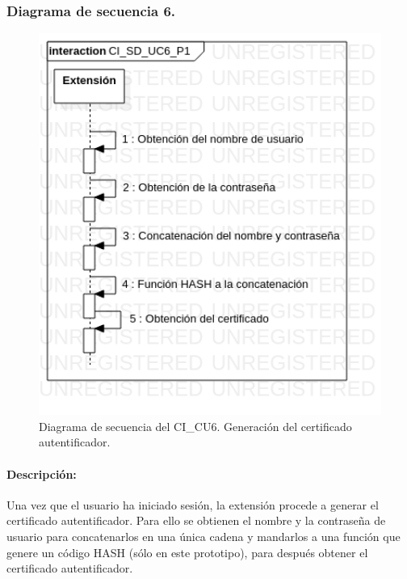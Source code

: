 \documentclass[12pt, a4paper, titlepage]{report}
\begin{document}
    			\subsubsection{Diagrama de secuencia 6.}
        			\begin{figure}[H]
        				\begin{center}    		    	\includegraphics[width=15cm]{./imagenes/Disenio/Componente_1/CI_SD_UC6_P1.png}
        				\caption[Diagrama de secuencia 6 del Componente I]{Diagrama de secuencia del CI\_CU6. Generación del certificado autentificador.}
        				\end{center}
        			\end{figure}
        			
        			\paragraph{Descripción:}
        			Una vez que el usuario ha iniciado sesión, la extensión procede a generar el certificado autentificador. Para ello se obtienen el nombre y la contraseña de usuario para concatenarlos en una única cadena y mandarlos a una función que genere un código HASH (sólo en este prototipo), para después obtener el certificado autentificador.
    			
\end{document}
